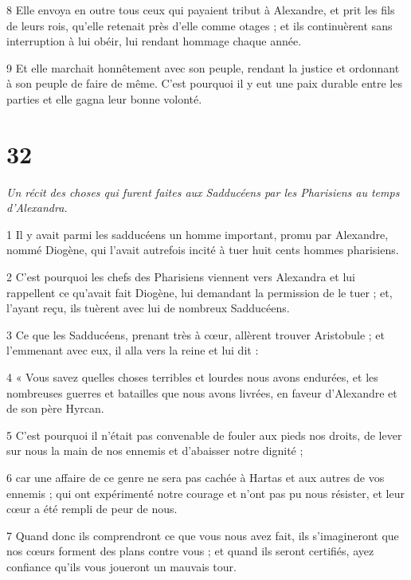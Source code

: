 \par 8 Elle envoya en outre tous ceux qui payaient tribut à Alexandre, et prit les fils de leurs rois, qu'elle retenait près d'elle comme otages ; et ils continuèrent sans interruption à lui obéir, lui rendant hommage chaque année.

\par 9 Et elle marchait honnêtement avec son peuple, rendant la justice et ordonnant à son peuple de faire de même. C'est pourquoi il y eut une paix durable entre les parties et elle gagna leur bonne volonté.

\chapter{32}

\par \textit{Un récit des choses qui furent faites aux Sadducéens par les Pharisiens au temps d'Alexandra.}

\par 1 Il y avait parmi les sadducéens un homme important, promu par Alexandre, nommé Diogène, qui l'avait autrefois incité à tuer huit cents hommes pharisiens.

\par 2 C'est pourquoi les chefs des Pharisiens viennent vers Alexandra et lui rappellent ce qu'avait fait Diogène, lui demandant la permission de le tuer ; et, l'ayant reçu, ils tuèrent avec lui de nombreux Sadducéens.

\par 3 Ce que les Sadducéens, prenant très à cœur, allèrent trouver Aristobule ; et l'emmenant avec eux, il alla vers la reine et lui dit :

\par 4 « Vous savez quelles choses terribles et lourdes nous avons endurées, et les nombreuses guerres et batailles que nous avons livrées, en faveur d'Alexandre et de son père Hyrcan.

\par 5 C'est pourquoi il n'était pas convenable de fouler aux pieds nos droits, de lever sur nous la main de nos ennemis et d'abaisser notre dignité ;

\par 6 car une affaire de ce genre ne sera pas cachée à Hartas et aux autres de vos ennemis ; qui ont expérimenté notre courage et n'ont pas pu nous résister, et leur cœur a été rempli de peur de nous.

\par 7 Quand donc ils comprendront ce que vous nous avez fait, ils s'imagineront que nos cœurs forment des plans contre vous ; et quand ils seront certifiés, ayez confiance qu'ils vous joueront un mauvais tour.

